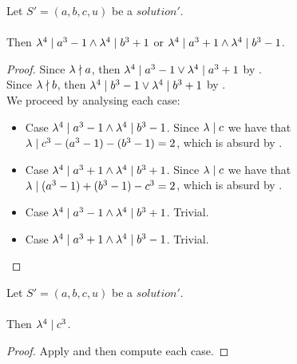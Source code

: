\begin{lemma}
    \label{lmm:a_cube_b_cube_same_congr}
    \leanok
    Let $S'=(a, b, c, u)$ be a $solution'$. \\\\
    Then $\lambda^4 \mid a^3 - 1 \land \lambda^4 \mid b^3 + 1$ or
    $\lambda^4 \mid a^3 + 1 \land \lambda^4 \mid b^3 - 1$.
\end{lemma}
\begin{proof}
    \leanok
    Since $\lambda \nmid a$, then
    $\lambda^4 \mid a^3 - 1 \lor \lambda^4 \mid a^3 + 1$ by
    . \\
    Since $\lambda \nmid b$, then
    $\lambda^4 \mid b^3 - 1 \lor \lambda^4 \mid b^3 + 1$ by
    . \\
    We proceed by analysing each case:
    \begin{itemize}
        \item Case $\lambda^4 \mid a^3 - 1 \land \lambda^4 \mid b^3 - 1$.
        Since $\lambda \mid c$ we have that $\lambda \mid c^3-(a^3-1)-(b^3-1) = 2$,
        which is absurd by .
        \item Case $\lambda^4 \mid a^3 + 1 \land \lambda^4 \mid b^3 + 1$.
        Since $\lambda \mid c$ we have that $\lambda \mid (a^3-1)+(b^3-1)-c^3 = 2$,
        which is absurd by .
        \item Case $\lambda^4 \mid a^3 - 1 \land \lambda^4 \mid b^3 + 1$. Trivial.
        \item Case $\lambda^4 \mid a^3 + 1 \land \lambda^4 \mid b^3 - 1$. Trivial.
    \end{itemize}
\end{proof}

\begin{lemma}
    \label{lmm:lambda_pow_four_dvd_c_cube}
    \leanok
    Let $S'=(a, b, c, u)$ be a $solution'$. \\\\
    Then $\lambda^4 \mid c^3$.
\end{lemma}
\begin{proof}
    \leanok
    Apply  and then compute each case.
\end{proof}

